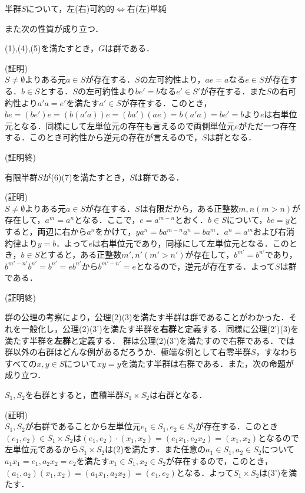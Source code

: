 \begin{sprop}
半群$S$について，左(右)可約的$\Longleftrightarrow$右(左)単純
\end{sprop}
また次の性質が成り立つ．
\begin{sthm}
(1),(4),(5)を満たすとき，$G$は群である．
\end{sthm}
(証明)\\
$S\neq\emptyset$よりある元$a\in S$が存在する．$S$の左可約性より，$ae=a$なる$e\in S$が存在する．$b\in S$とする．$S$の左可約性より$be'=b$なる$e'\in S'$が存在する．また$S$の右可約性より$a'a=e'$を満たす$a'\in S$が存在する．このとき，$be=(be')e=(b(a'a))e=(ba')(ae)=b(a'a)=be'=b$より$e$は右単位元となる．同様にして左単位元の存在も言えるので両側単位元$e$がただ一つ存在する．このとき可約性から逆元の存在が言えるので，$S$は群となる．
\begin{flushright}
(証明終)
\end{flushright}
\begin{sthm}
有限半群$S$が(6)(7)を満たすとき，$S$は群である．
\end{sthm}
(証明)\\
$S\neq\emptyset$よりある元$a\in S$が存在する．$S$は有限だから，ある正整数$m,n(m>n)$が存在して，$a^m=a^n$となる．ここで，$e=a^{m-n}$とおく．$b\in S$について，$be=y$とすると，両辺に右から$a^n$をかけて，$ya^n=ba^{m-n}a^n=ba^m$．$a^n=a^m$および右消約律より$y=b$．よって$e$は右単位元であり，同様にして左単位元となる．このとき，$b\in S$とすると，ある正整数$m',n'(m'>n')$が存在して，$b^{m'}=b^{n'}$であり，$b^{m'-n'}b^{n'}=b^{n'}=eb^{n'}$から$b^{m'-n'}=e$となるので，逆元が存在する．よって$S$は群である．
\begin{flushright}
(証明終)
\end{flushright}
群の公理の考察により，公理(2)(3)を満たす半群は群であることがわかった．それを一般化し，公理(2)(3')を満たす半群を{\bf 右群}と定義する．同様に公理(2')(3)を満たす半群を{\bf 左群}と定義する．
群は公理(2)(3')を満たすので右群である．では群以外の右群はどんな例があるだろうか．極端な例として右零半群$S$，すなわちすべての$x,y\in S$について$xy=y$を満たす半群は右群である．また，次の命題が成り立つ．
\begin{sprop}
$S_1,S_2$を右群とすると，直積半群$S_1\times S_2$は右群となる．
\end{sprop}
(証明)\\
$S_1,S_2$が右群であることから左単位元$e_1\in S_1,e_2\in S_2$が存在する．このとき$(e_1,e_2)\in S_1\times S_2$は$(e_1,e_2)\cdot(x_1,x_2)=(e_1x_1,e_2x_2)=(x_1,x_2)$となるので左単位元であるから$S_1\times S_2$は(2)を満たす．また任意の$a_1\in S_1,a_2\in S_2$について$a_1x_1=e_1,a_2x_2=e_2$を満たす$x_1\in S_1,x_2\in S_2$が存在するので，このとき，$(a_1,a_2)(x_1,x_2)=(a_1x_1,a_2x_2)=(e_1,e_2)$となる．よって$S_1\times S_2$は(3’)を満たす．
